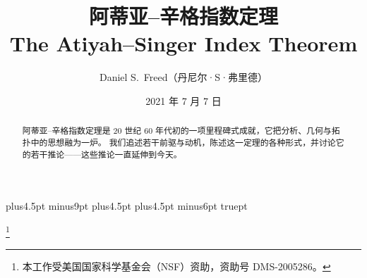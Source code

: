 \documentclass[11pt]{amsart}
\theoremstyle{definition}
\theoremstyle{remark}
\theoremstyle{plain}
\numberwithin{equation}{section}
\renewcommand{\:}{\colon}
\DeclareMathOperator{\coker}{coker}
\DeclareMathOperator{\pfaff}{pfaff}
\newcommand{\sL}{\mathcal{L}}
\newcommand{\sect}[1]{\sL(#1)}
\begin{document}
 plus4.5pt minus9pt
\belowdisplayskip \abovedisplayskip
{} plus4.5pt
 plus4.5pt minus6pt
 truept
\marginparwidth=55pt

\makeatletter
\renewcommand{\tocsection}[3]{%
  \indentlabel{\@ifempty{#2}{\hskip1.5em}{\ignorespaces#1 #2.\;\;}}#3}
\renewcommand{\tocsubsection}[3]{%
  \indentlabel{\@ifempty{#2}{\hskip 2.5em}{\hskip 2.5em\ignorespaces#1%
    #2.\;\;}}#3} 
\renewcommand{\tocsubsubsection}[3]{%
  \indentlabel{\@ifempty{#2}{\hskip 5.5em}{\hskip 5.5em\ignorespaces#1%
    #2.\;\;}}#3} 
\def\@makefnmark{%
  \leavevmode
  \raise.9ex\hbox{\fontsize\sf@size\z@\normalfont\tiny\@thefnmark}} 
\def\multfoot{\textsuperscript{\tiny\color{red},}}
\def\footref#1{$\textsuperscript{\tiny\ref{#1}}$}
\makeatother

\setcounter{tocdepth}{2}


\renewcommand{\proofname}{证明}
\renewcommand{\contentsname}{目录}
\renewcommand{\refname}{参考文献}
\providecommand{\Coker}{\coker}
\providecommand{\Pfaff}{\pfaff}
\providecommand{\Sect}{\sect}



\title[阿蒂亚--辛格指数定理]{阿蒂亚--辛格指数定理\\[6pt]
  {\large\mdseries The Atiyah--Singer Index Theorem}}
\author[弗里德]{Daniel S.~Freed（丹尼尔·S·弗里德）}
\thanks{本工作受美国国家科学基金会（NSF）资助，资助号 DMS-2005286。}
\address{德克萨斯大学奥斯汀分校数学系\\ Austin, TX 78712, USA}
\email{[邮箱隐去]}
\date{2021 年 7 月 7 日}
\renewcommand{\abstractname}{摘要}
\begin{abstract}
阿蒂亚--辛格指数定理是 20 世纪 60 年代初的一项里程碑式成就，它把分析、几何与拓扑中的思想融为一炉。
我们追述若干前驱与动机，陈述这一定理的各种形式，并讨论它的若干推论——这些推论一直延伸到今天。
\end{abstract}
\maketitle



{\small
\makeatletter
\def\reftext{参考文献}
\renewcommand{\tocsection}[3]{%
  \begingroup
   \def\tmp{#3}%
   \ifx\tmp\reftext
  \indentlabel{\phantom{1}\;\;} #3%
  \else
  \indentlabel{\@ifempty{#2}{\hskip1.5em}{\ignorespaces#1 #2.\;\;}}#3%
  \fi\endgroup}
\makeatother
\tableofcontents
}
\end{document}
